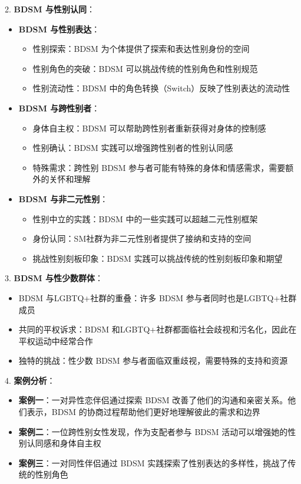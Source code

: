 \documentclass[12pt,UTF8]{ctexbook}
\begin{document}
2. \textbf{BDSM 与性别认同}：
  \begin{itemize}
  \item \textbf{BDSM 与性别表达}：
    \begin{itemize}
    \item 性别探索：BDSM 为个体提供了探索和表达性别身份的空间
    \item 性别角色的突破：BDSM 可以挑战传统的性别角色和性别规范
    \item 性别流动性：BDSM 中的角色转换（Switch）反映了性别表达的流动性
    \end{itemize}
  \item \textbf{BDSM 与跨性别者}：
    \begin{itemize}
    \item 身体自主权：BDSM 可以帮助跨性别者重新获得对身体的控制感
    \item 性别确认：BDSM 实践可以增强跨性别者的性别认同感
    \item 特殊需求：跨性别 BDSM 参与者可能有特殊的身体和情感需求，需要额外的关怀和理解
    \end{itemize}
  \item \textbf{BDSM 与非二元性别}：
    \begin{itemize}
    \item 性别中立的实践：BDSM 中的一些实践可以超越二元性别框架
    \item 身份认同：SM社群为非二元性别者提供了接纳和支持的空间
    \item 挑战性别刻板印象：BDSM 实践可以挑战传统的性别刻板印象和期望
    \end{itemize}
  \end{itemize}

3. \textbf{BDSM 与性少数群体}：
  \begin{itemize}
  \item BDSM 与LGBTQ+社群的重叠：许多 BDSM 参与者同时也是LGBTQ+社群成员
  \item 共同的平权诉求：BDSM 和LGBTQ+社群都面临社会歧视和污名化，因此在平权运动中经常合作
  \item 独特的挑战：性少数 BDSM 参与者面临双重歧视，需要特殊的支持和资源
  \end{itemize}

4. \textbf{案例分析}：
  \begin{itemize}
  \item \textbf{案例一}：一对异性恋伴侣通过探索 BDSM 改善了他们的沟通和亲密关系。他们表示，BDSM 的协商过程帮助他们更好地理解彼此的需求和边界
  \item \textbf{案例二}：一位跨性别女性发现，作为支配者参与 BDSM 活动可以增强她的性别认同感和身体自主权
  \item \textbf{案例三}：一对同性伴侣通过 BDSM 实践探索了性别表达的多样性，挑战了传统的性别角色
  \end{itemize}
\end{document}
